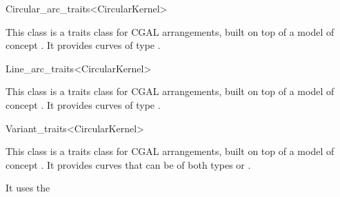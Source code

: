 \begin{ccRefClass}{Circular_arc_traits<CircularKernel>}

\ccDefinition

This class is a traits class for CGAL arrangements, built on top of a model of 
concept .
It provides curves of type .

\ccIsModel
{}

\end{ccRefClass}
\begin{ccRefClass}{Line_arc_traits<CircularKernel>}

\ccDefinition

This class is a traits class for CGAL arrangements, built on top of  a model of 
concept . 
It provides curves of type . 

\ccIsModel
{}

\end{ccRefClass}
\begin{ccRefClass}{Variant_traits<CircularKernel>}

\ccDefinition

This class is a traits class for CGAL arrangements, built on top of  a model of 
concept . 
It provides curves that can be of both types 
 or 
.

It uses the  

\ccIsModel
{}

\end{ccRefClass}
